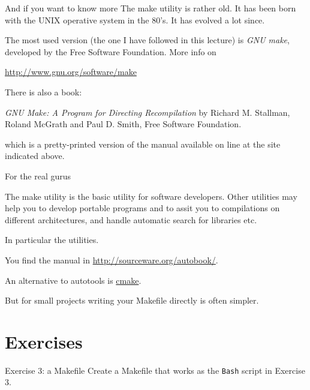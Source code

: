 \documentclass[10pt,aspectratio=169]{beamer}
\newcommand{\red}{\color{red}}
\begin{document}
\begin{frame}{And if you want to know more}
The make utility is rather old. It has been born with the UNIX operative
system in the 80's. It has evolved a lot since. 

The most used version (the one I have followed in this lecture) is \emph{GNU make}, developed by the Free Software Foundation. More info on

\href{http://www.gnu.org/software/make}{http://www.gnu.org/software/make}
\medskip

There is also a book:
\smallskip

\emph{GNU Make: A Program for Directing Recompilation}
by Richard M. Stallman, Roland McGrath and Paul D. Smith, Free Software
Foundation.
\smallskip

which is a pretty-printed version of the manual available on line at the
site indicated above.
\end{frame}



\begin{frame}{For the real gurus}

The make utility is the basic utility for software developers. Other
utilities may help you to develop portable programs and to assit you to
compilations on different architectures, and handle automatic search for libraries etc.
\smallskip


In particular the \red{autotools} utilities. 

You find the manual in 
\href{http://sourceware.org/autobook/}{http://sourceware.org/autobook/}.
\smallskip

An alternative to autotools is \href{https://cmake.org/}{cmake}.
\medskip

But for small projects writing your Makefile directly is often simpler.
\end{frame}

\section*{Exercises}
\begin{frame}{Exercise 3: a Makefile}
  Create a Makefile that works as the \texttt{Bash} script in Exercise 3.
\end{frame}
\end{document}
